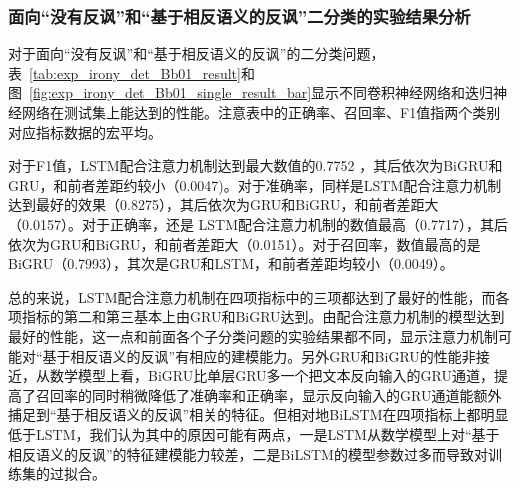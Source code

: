 \subsubsection{面向“没有反讽”和“基于相反语义的反讽”二分类的实验结果分析}
\label{sssec:exp_irony_det_Bb01_base}

对于面向“没有反讽”和“基于相反语义的反讽”的二分类问题，表~\ref{tab:exp_irony_det_Bb01_result}和图~\ref{fig:exp_irony_det_Bb01_single_result_bar}显示不同卷积神经网络和迭归神经网络在测试集上能达到的性能。注意表中的正确率、召回率、F1值指两个类别对应指标数据的宏平均。

对于F1值，LSTM配合注意力机制达到最大数值的0.7752 ，其后依次为BiGRU和GRU，和前者差距约较小（0.0047)。对于准确率，同样是LSTM配合注意力机制达到最好的效果（0.8275），其后依次为GRU和BiGRU，和前者差距大（0.0157）。对于正确率，还是 LSTM配合注意力机制的数值最高（0.7717），其后依次为GRU和BiGRU，和前者差距大（0.0151）。对于召回率，数值最高的是BiGRU（0.7993），其次是GRU和LSTM，和前者差距均较小（0.0049）。

总的来说，LSTM配合注意力机制在四项指标中的三项都达到了最好的性能，而各项指标的第二和第三基本上由GRU和BiGRU达到。由配合注意力机制的模型达到最好的性能，这一点和前面各个子分类问题的实验结果都不同，显示注意力机制可能对“基于相反语义的反讽”有相应的建模能力。另外GRU和BiGRU的性能非接近，从数学模型上看，BiGRU比单层GRU多一个把文本反向输入的GRU通道，提高了召回率的同时稍微降低了准确率和正确率，显示反向输入的GRU通道能额外捕足到“基于相反语义的反讽”相关的特征。但相对地BiLSTM在四项指标上都明显低于LSTM，我们认为其中的原因可能有两点，一是LSTM从数学模型上对“基于相反语义的反讽”的特征建模能力较差，二是BiLSTM的模型参数过多而导致对训练集的过拟合。

